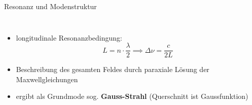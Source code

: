 \documentclass[10pt, aspectratio=169]{beamer}
\begin{document}
\begin{frame}{Resonanz und Modenstruktur}
  \begin{columns}
      
    \begin{itemize}
    \item<1-> longitudinale Resonanzbedingung:
      \begin{equation}
        \label{eq:longmodes}
        L=n\cdot\frac{\lambda}{2} \implies \Delta\nu = \frac{c}{2L}
      \end{equation}
    \item<2-> Beschreibung des gesamten Feldes durch paraxiale
      L\"osung der Maxwellgleichungen 
    \item<3-> ergibt als Grundmode sog. \textbf{Gauss-Strahl}
      (Querschnitt ist Gaussfunktion) 
    \end{itemize}
  \end{columns}
\end{frame}
\end{document}
